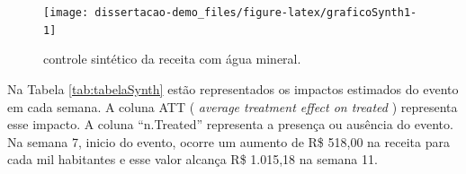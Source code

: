 \documentclass[
  12pt,
]{book}
\begin{document}
\begin{figure}

{\centering \texttt{[image: dissertacao-demo\_files/figure-latex/graficoSynth1-1]} 

}

\caption{controle sintético da receita com água mineral.}\label{fig:graficoSynth1}
\end{figure}

Na Tabela \ref{tab:tabelaSynth} estão representados os impactos estimados do evento em cada semana. A coluna ATT ( \emph{average treatment effect on treated} ) representa esse impacto. A coluna ``n.Treated'' representa a presença ou ausência do evento. Na semana 7, inicio do evento, ocorre um aumento de R\$ 518,00 na receita para cada mil habitantes e esse valor alcança R\$ 1.015,18 na semana 11.
\end{document}
